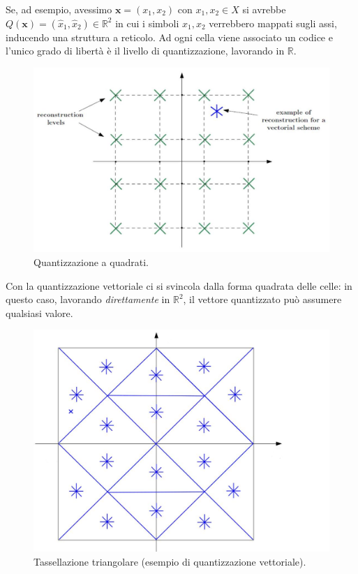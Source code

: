 \begin{minipage}{0.4\textwidth}
Se, ad esempio, avessimo $\mathbf{x} = (x_1, x_2)$ con $x_1, x_2 \in X$ si avrebbe $Q(\mathbf{x}) = (\hat{x}_1, \hat{x}_2) \in \mathbb{R}^2$ in cui i simboli $x_1, x_2$ verrebbero mappati sugli assi, inducendo una struttura a reticolo. Ad ogni cella viene associato un codice e l'unico grado di libert\`a \`e il livello di quantizzazione, lavorando in $\mathbb{R}$.
\begin{figure}[H]
    \centering
    \includegraphics[scale=0.20]{img/ret.jpg}
    \caption{Quantizzazione a quadrati.}
    \label{fig:ret}
\end{figure}
\end{minipage} \hfill
\begin{minipage}{0.4\textwidth}
Con la quantizzazione vettoriale ci si svincola dalla forma quadrata delle celle: in questo caso, lavorando \textit{direttamente} in $\mathbb{R}^2$, il vettore quantizzato pu\`o assumere qualsiasi valore.
\begin{figure}[H]
    \centering
    \includegraphics[scale=0.180]{img/vect.png}
    \caption{Tassellazione triangolare (esempio di quantizzazione vettoriale).}
    \label{fig:vect}
\end{figure}
\end{minipage} \\

